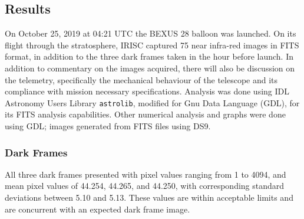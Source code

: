 \subsection{Results}

On October 25, 2019 at 04:21 UTC the BEXUS 28 balloon was launched. On its flight through the stratosphere, IRISC captured 75 near infra-red images in FITS format, in addition to the three dark frames taken in the hour before launch. In addition to commentary on the images acquired, there will also be discussion on the telemetry, specifically the mechanical behaviour of the telescope and its compliance with mission necessary specifications. Analysis was done using IDL Astronomy Users Library \texttt{astrolib}, modified for Gnu Data Language (GDL), for its FITS analysis capabilities. Other numerical analysis and graphs were done using GDL; images generated from FITS files using DS9.

\subsubsection{Dark Frames} 
All three dark frames presented with pixel values ranging from 1 to 4094, and mean pixel values of 44.254, 44.265, and 44.250, with corresponding standard deviations between 5.10 and 5.13. These values are within acceptable limits and are concurrent with an expected dark frame image. 

